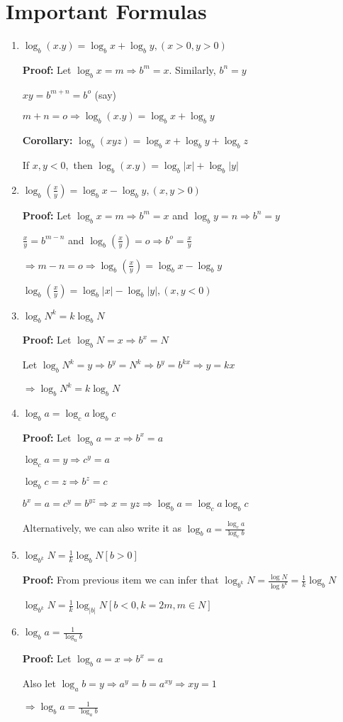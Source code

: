 \section{Important Formulas}
\begin{enumerate}
\item $\log_b(x.y) = \log_bx + \log_by, (x>0, y>0)$

  \textbf{Proof:} Let $\log_bx = m \Rightarrow b^m = x$. Similarly, $b^n = y$

  $xy = b^{m + n} = b^o$ (say)

  $m + n = o \Rightarrow \log_b(x.y) = \log_bx + \log_by$

  \textbf{Corollary:} $\log_b(xyz) = \log_bx + \log_by + \log_bz$

  If $x, y < 0,$ then $\log_b(x.y) = \log_b|x| + \log_b|y|$
\item $\log_b\left(\frac{x}{y}\right) = \log_b x - \log_b y, (x, y > 0)$

  \textbf{Proof:} Let $\log_bx = m \Rightarrow b^m = x$ and $\log_by = n \Rightarrow b^n = y$

  $\frac{x}{y} = b^{m - n}$ and $\log_b\left(\frac{x}{y}\right) = o \Rightarrow b^o = \frac{x}{y}$

  $\Rightarrow m - n = o \Rightarrow \log_b\left(\frac{x}{y}\right) = \log_b x - \log_b y$

  $\log_b\left(\frac{x}{y}\right) = \log_b|x| - \log_b|y|, (x, y < 0)$
\item $\log_bN^k = k\log_b N$

  \textbf{Proof:} Let $\log_bN = x \Rightarrow b^x = N$

  Let $\log_bN^k = y \Rightarrow b^y = N^k \Rightarrow b^y = b^{kx} \Rightarrow y = kx$

  $\Rightarrow \log_bN^k = k\log_b N$
\item $\log_ba = \log_ca\log_bc$

  \textbf{Proof:} Let $\log_ba = x \Rightarrow b^x = a$

  $\log_ca = y \Rightarrow c^y = a$

  $\log_bc = z \Rightarrow b^z = c$

  $b^x = a = c^y = b^{yz} \Rightarrow x = yz \Rightarrow \log_ba = \log_ca\log_bc$

  Alternatively, we can also write it as $\log_ba = \frac{\log_ca}{\log_cb}$
\item $\log_{b^k}N = \frac{1}{k}\log_bN[b > 0]$

  \textbf{Proof:} From previous item we can infer that $\log_{b^k}N = \frac{\log N}{\log b^k} = \frac{1}{k}\log_bN$

  $\log_{b^k}N = \frac{1}{k}\log_{|b|}N[b< 0, k = 2m, m\in N]$
\item $\log_ba = \frac{1}{\log_ab}$

  \textbf{Proof:} Let $\log_ba = x \Rightarrow b^x = a$

  Also let $\log_ab = y \Rightarrow a^y = b = a^{xy} \Rightarrow xy = 1$

  $\Rightarrow \log_ba = \frac{1}{\log_ab}$
\end{enumerate}

